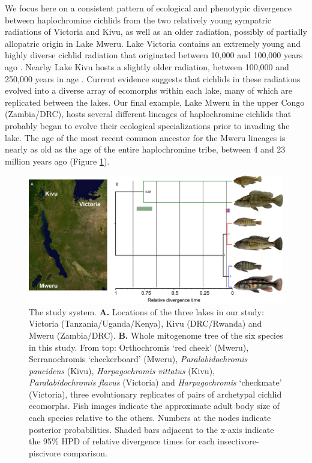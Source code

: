 We focus here on a consistent pattern of ecological and phenotypic divergence between haplochromine cichlids from the two relatively young sympatric radiations of Victoria and Kivu, as well as an older radiation, possibly of partially allopatric origin in Lake Mweru. Lake Victoria contains an extremely young and highly diverse cichlid radiation that originated between 10,000 and 100,000 years ago \cite{seehausen2002patterns, genner2007age, salzburger2014ecology}. Nearby Lake Kivu hosts a slightly older radiation, between 100,000 and 250,000 years in age \cite{genner2007age, bezault2011population, salzburger2014ecology}. Current evidence suggests that cichlids in these radiations evolved into a diverse array of ecomorphs within each lake, many of which are replicated between the lakes. Our final example, Lake Mweru in the upper Congo (Zambia/DRC), hosts several different lineages of haplochromine cichlids that probably began to evolve their ecological specializations prior to invading the lake. The age of the most recent common ancestor for the Mweru lineages is nearly as old as the age of the entire haplochromine tribe, between 4 and 23 million years ago \cite{genner2007age, wagner2012ecological, friedman2013molecular} (Figure \ref{UL_fig1}).

\begin{figure}
\includegraphics[width=\textwidth]{uLakes/figures/fig1}
\caption{The study system. \textbf{A.} Locations of the three lakes in our study: Victoria (Tanzania/Uganda/Kenya), Kivu (DRC/Rwanda) and Mweru (Zambia/DRC). \textbf{B.} Whole mitogenome tree of the six species in this study. From top: Orthochromis `red cheek' (Mweru), Serranochromis `checkerboard' (Mweru), {\em Paralabidochromis paucidens} (Kivu), {\em Harpagochromis vittatus} (Kivu), {\em Paralabidochromis flavus} (Victoria) and {\em Harpagochromis} `checkmate' (Victoria), three evolutionary replicates of pairs of archetypal cichlid ecomorphs. Fish images indicate the approximate adult body size of each species relative to the others. Numbers at the nodes indicate posterior probabilities. Shaded bars adjacent to the x-axis indicate the 95\% HPD of relative divergence times for each insectivore-piscivore comparison.}
\label{UL_fig1}
\end{figure}

